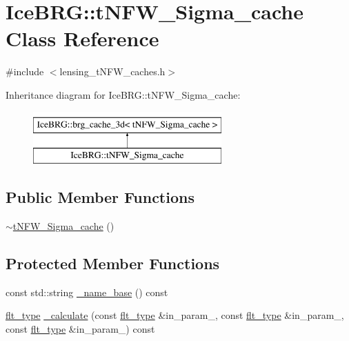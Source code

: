\hypertarget{classIceBRG_1_1tNFW__Sigma__cache}{\section{Ice\-B\-R\-G\-:\-:t\-N\-F\-W\-\_\-\-Sigma\-\_\-cache Class Reference}
\label{classIceBRG_1_1tNFW__Sigma__cache}
}


{\ttfamily \#include $<$lensing\-\_\-t\-N\-F\-W\-\_\-caches.\-h$>$}

Inheritance diagram for Ice\-B\-R\-G\-:\-:t\-N\-F\-W\-\_\-\-Sigma\-\_\-cache\-:\begin{figure}[H]
\begin{center}
\leavevmode
\includegraphics[height=2.000000cm]{classIceBRG_1_1tNFW__Sigma__cache}
\end{center}
\end{figure}
\subsection*{Public Member Functions}
\begin{DoxyCompactItemize}
\item 
\hyperlink{classIceBRG_1_1tNFW__Sigma__cache_ad1eb185ee4cf56fcea3fd56ba3f768b5}{$\sim$t\-N\-F\-W\-\_\-\-Sigma\-\_\-cache} ()
\end{DoxyCompactItemize}
\subsection*{Protected Member Functions}
\begin{DoxyCompactItemize}
\item 
const std\-::string \hyperlink{classIceBRG_1_1tNFW__Sigma__cache_add7a48fb279fed783f4670c3cd940d7e}{\-\_\-name\-\_\-base} () const 
\item 
\hyperlink{lib_2IceBRG__main_2common_8h_ad0f130a56eeb944d9ef2692ee881ecc4}{flt\-\_\-type} \hyperlink{classIceBRG_1_1tNFW__Sigma__cache_a362d58c29eda67d75183d090385649bf}{\-\_\-calculate} (const \hyperlink{lib_2IceBRG__main_2common_8h_ad0f130a56eeb944d9ef2692ee881ecc4}{flt\-\_\-type} \&in\-\_\-param\-\_, const \hyperlink{lib_2IceBRG__main_2common_8h_ad0f130a56eeb944d9ef2692ee881ecc4}{flt\-\_\-type} \&in\-\_\-param\-\_, const \hyperlink{lib_2IceBRG__main_2common_8h_ad0f130a56eeb944d9ef2692ee881ecc4}{flt\-\_\-type} \&in\-\_\-param\-\_) const 
\end{DoxyCompactItemize}
